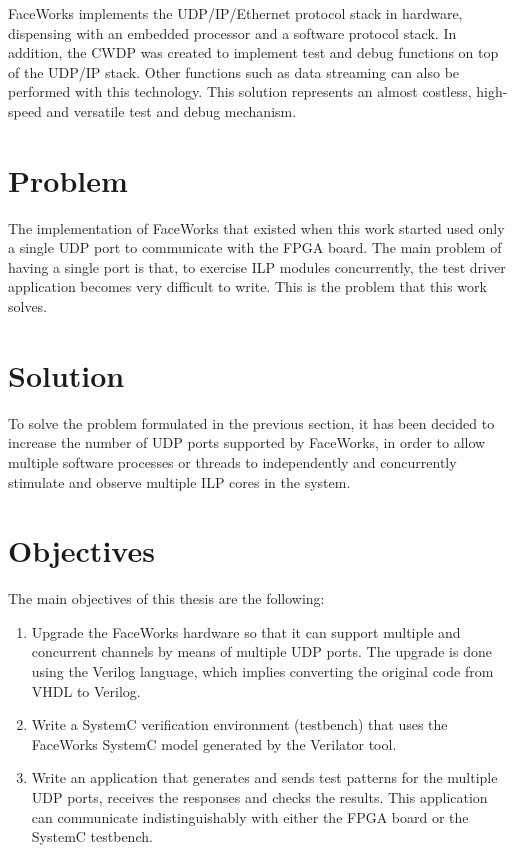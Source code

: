 \documentclass[defaultstyle,10pt,master,Helvetica]{thesis}
\begin{document}
FaceWorks implements the \ac{UDP}/\ac{IP}/Ethernet protocol stack in hardware, dispensing with an embedded processor and a software protocol stack. In addition, the \acf{CWDP} was created to implement test and debug functions on top of the \ac{UDP}/\ac{IP} stack. Other functions such as data streaming can also be performed with this technology. This solution represents an almost costless, high-speed and versatile test and debug mechanism.


\section{Problem}

The implementation of FaceWorks that existed when this work started used only a single \ac{UDP} port to communicate with the \ac{FPGA} board. The main problem of having a single port is that, to exercise \acs{ILP} modules concurrently, the test driver application becomes very difficult to write. This is the problem that this work solves.

\section{Solution}

To solve the problem formulated in the previous section, it has been decided to increase the number of \ac{UDP} ports supported by FaceWorks, in order to allow multiple software processes or threads to independently and concurrently stimulate and observe multiple \ac{ILP} cores in the system.


\section{Objectives}
The main objectives of this thesis are the following:
\begin{enumerate}

\item Upgrade the FaceWorks hardware so that it can support multiple and concurrent channels by means of multiple \ac{UDP} ports. The upgrade is done using the Verilog language, which implies converting the original code from \ac{VHDL} to Verilog.

\item Write a SystemC verification environment (testbench) that uses the FaceWorks SystemC model generated by the Verilator tool.

\item Write an application that generates and sends test patterns for the multiple \ac{UDP} ports, receives the responses and checks the results. This application can communicate indistinguishably with either the FPGA board or the SystemC testbench.

\end{enumerate}
\end{document}

